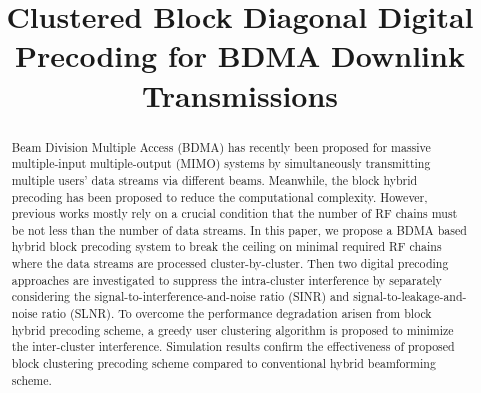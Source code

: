 \documentclass[conference]{IEEEtran}
\begin{document}
\title{Clustered Block Diagonal Digital Precoding for BDMA Downlink Transmissions}
\author{}
\maketitle\thispagestyle{plain}\pagestyle{plain}

\begin{abstract}
Beam Division Multiple Access (BDMA) has recently been proposed for massive multiple-input multiple-output (MIMO) systems by simultaneously transmitting multiple users' data streams via different beams. Meanwhile, the block hybrid precoding has been proposed to reduce the computational complexity. However, previous works mostly rely on a crucial condition that the number of RF chains must be not less than the number of data streams. In this paper, we propose a BDMA based hybrid block precoding system to break the ceiling on minimal required RF chains where the data streams are processed cluster-by-cluster. Then two digital precoding approaches are investigated to suppress the intra-cluster interference by separately considering the signal-to-interference-and-noise ratio (SINR) and signal-to-leakage-and-noise ratio (SLNR). To overcome the performance degradation arisen from block hybrid precoding scheme, a greedy user clustering algorithm is proposed to minimize the inter-cluster interference. Simulation results confirm the effectiveness of proposed block clustering precoding scheme compared to conventional hybrid beamforming scheme.
\end{abstract}
\end{document}
